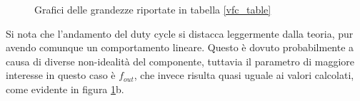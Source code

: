\begin{figure}[H]
\begin{subfigure}{.5\textwidth}
    \end{subfigure}

    \caption{Grafici delle grandezze riportate in tabella \ref{vfc_table}}
    \label{vfc_graphs}
\end{figure}

Si nota che l'andamento del duty cycle si distacca leggermente dalla teoria, pur avendo
comunque un comportamento lineare. Questo è dovuto probabilmente a causa di diverse
non-idealità del componente, tuttavia il parametro di maggiore interesse in questo caso è
$f_{out}$, che invece risulta quasi uguale ai valori calcolati, come evidente in figura
\ref{vfc_graphs}b.

